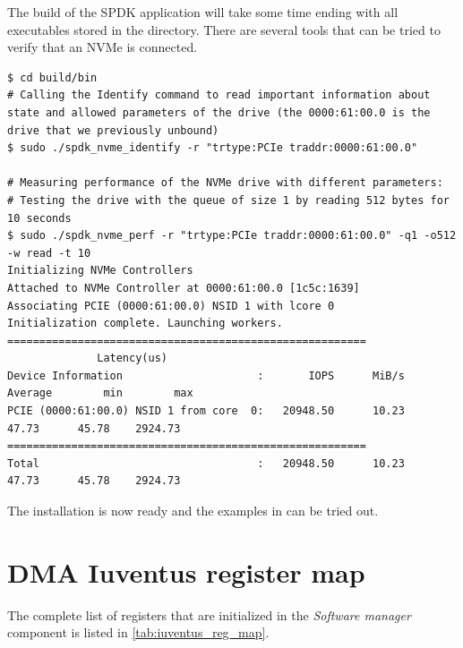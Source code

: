 The build of the SPDK application will take some time ending with all executables stored in the
 directory. There are several tools that can be tried to verify that an NVMe is
connected.

\begin{lstlisting}[caption={Testing NVMe drive using native SPDK tools}]
$ cd build/bin
# Calling the Identify command to read important information about state and allowed parameters of the drive (the 0000:61:00.0 is the drive that we previously unbound)
$ sudo ./spdk_nvme_identify -r "trtype:PCIe traddr:0000:61:00.0"

# Measuring performance of the NVMe drive with different parameters:
# Testing the drive with the queue of size 1 by reading 512 bytes for 10 seconds
$ sudo ./spdk_nvme_perf -r "trtype:PCIe traddr:0000:61:00.0" -q1 -o512 -w read -t 10
Initializing NVMe Controllers
Attached to NVMe Controller at 0000:61:00.0 [1c5c:1639]
Associating PCIE (0000:61:00.0) NSID 1 with lcore 0
Initialization complete. Launching workers.
========================================================
              Latency(us)
Device Information                     :       IOPS      MiB/s    Average        min        max
PCIE (0000:61:00.0) NSID 1 from core  0:   20948.50      10.23      47.73      45.78    2924.73
========================================================
Total                                  :   20948.50      10.23      47.73      45.78    2924.73
\end{lstlisting}

The installation is now ready and the examples in  can be tried out.

\chapter{DMA Iuventus register map}
\label{chap:iuventus_reg_map}

The complete list of registers that are initialized in the \emph{Software manager} component is
listed in \cref{tab:iuventus_reg_map}.

